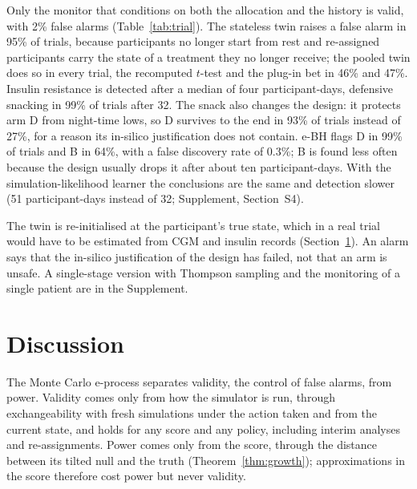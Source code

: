 \documentclass[12pt]{article}
\theoremstyle{remark}
\begin{document}
Only the monitor that conditions on both the allocation and the history is
valid, with 2\% false alarms (Table~\ref{tab:trial}). The stateless twin raises
a false alarm in 95\% of trials, because participants no longer start from rest
and re-assigned participants carry the state of a treatment they no longer
receive; the pooled twin does so in every trial, the recomputed $t$-test and
the plug-in bet in 46\% and 47\%. Insulin resistance is detected after a median
of four participant-days, defensive snacking in 99\% of trials after 32. The
snack also changes the design: it protects arm D from night-time lows, so D
survives to the end in 93\% of trials instead of 27\%, for a reason its
in-silico justification does not contain. e-BH flags D in 99\% of trials and B
in 64\%, with a false discovery rate of 0.3\%; B is found less often because
the design usually drops it after about ten participant-days. With the
simulation-likelihood learner the conclusions are the same and detection
slower (51 participant-days instead of 32; Supplement, Section~S4).

The twin is re-initialised at the participant's true state, which in a real
trial would have to be estimated from CGM and insulin records
(Section~\ref{sec:discussion}). An alarm says that the in-silico justification
of the design has failed, not that an arm is unsafe. A single-stage version
with Thompson sampling and the monitoring of a single patient are in the
Supplement.

\section{Discussion}\label{sec:discussion}\label{sec:related}

The Monte Carlo e-process separates validity, the control of false alarms,
from power. Validity comes only from how the simulator is run, through
exchangeability with fresh simulations under the action taken and from the
current state, and holds for any score and any policy, including interim
analyses and re-assignments. Power comes only from the score, through the
distance between its tilted null and the truth (Theorem~\ref{thm:growth});
approximations in the score therefore cost power but never validity.
\end{document}
